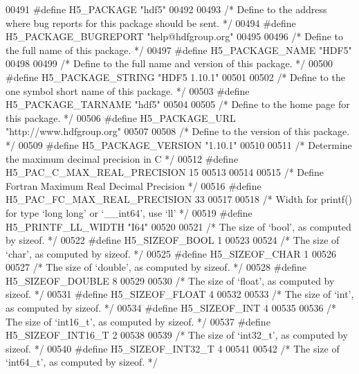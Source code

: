 \begin{DoxyCode}
{00491 \textcolor{preprocessor}{#define H5\_PACKAGE "hdf5"}
00492 
00493 \textcolor{comment}{/* Define to the address where bug reports for this package should be sent. */}
00494 \textcolor{preprocessor}{#define H5\_PACKAGE\_BUGREPORT "help@hdfgroup.org"}
00495 
00496 \textcolor{comment}{/* Define to the full name of this package. */}
00497 \textcolor{preprocessor}{#define H5\_PACKAGE\_NAME "HDF5"}
00498 
00499 \textcolor{comment}{/* Define to the full name and version of this package. */}
00500 \textcolor{preprocessor}{#define H5\_PACKAGE\_STRING "HDF5 1.10.1"}
00501 
00502 \textcolor{comment}{/* Define to the one symbol short name of this package. */}
00503 \textcolor{preprocessor}{#define H5\_PACKAGE\_TARNAME "hdf5"}
00504 
00505 \textcolor{comment}{/* Define to the home page for this package. */}
00506 \textcolor{preprocessor}{#define H5\_PACKAGE\_URL "http://www.hdfgroup.org"}
00507 
00508 \textcolor{comment}{/* Define to the version of this package. */}
00509 \textcolor{preprocessor}{#define H5\_PACKAGE\_VERSION "1.10.1"}
00510 
00511 \textcolor{comment}{/* Determine the maximum decimal precision in C */}
00512 \textcolor{preprocessor}{#define H5\_PAC\_C\_MAX\_REAL\_PRECISION 15}
00513 
00514 
00515 \textcolor{comment}{/* Define Fortran Maximum Real Decimal Precision */}
00516 \textcolor{preprocessor}{#define H5\_PAC\_FC\_MAX\_REAL\_PRECISION 33}
00517 
00518 \textcolor{comment}{/* Width for printf() for type `long long' or `\_\_int64', use `ll' */}
00519 \textcolor{preprocessor}{#define H5\_PRINTF\_LL\_WIDTH "I64"}
00520 
00521 \textcolor{comment}{/* The size of `bool', as computed by sizeof. */}
00522 \textcolor{preprocessor}{#define H5\_SIZEOF\_BOOL 1}
00523 
00524 \textcolor{comment}{/* The size of `char', as computed by sizeof. */}
00525 \textcolor{preprocessor}{#define H5\_SIZEOF\_CHAR 1}
00526 
00527 \textcolor{comment}{/* The size of `double', as computed by sizeof. */}
00528 \textcolor{preprocessor}{#define H5\_SIZEOF\_DOUBLE 8}
00529 
00530 \textcolor{comment}{/* The size of `float', as computed by sizeof. */}
00531 \textcolor{preprocessor}{#define H5\_SIZEOF\_FLOAT 4}
00532 
00533 \textcolor{comment}{/* The size of `int', as computed by sizeof. */}
00534 \textcolor{preprocessor}{#define H5\_SIZEOF\_INT 4}
00535 
00536 \textcolor{comment}{/* The size of `int16\_t', as computed by sizeof. */}
00537 \textcolor{preprocessor}{#define H5\_SIZEOF\_INT16\_T 2}
00538 
00539 \textcolor{comment}{/* The size of `int32\_t', as computed by sizeof. */}
00540 \textcolor{preprocessor}{#define H5\_SIZEOF\_INT32\_T 4}
00541 
00542 \textcolor{comment}{/* The size of `int64\_t', as computed by sizeof. */}
}
\end{DoxyCode}
